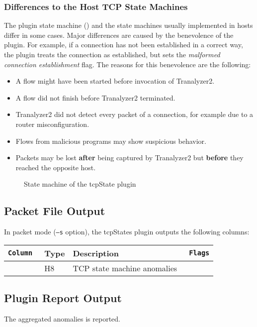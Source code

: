 \documentclass[documentation]{subfiles}
\begin{document}
\subsubsection{Differences to the Host TCP State Machines}
The plugin state machine () and the state machines usually implemented in hosts differ in some cases. Major differences are caused by the benevolence of the plugin. For example, if a connection has not been established in a correct way, the plugin treats the connection as established, but sets the {\em malformed connection establishment} flag. The reasons for this benevolence are the following:
\begin{itemize}
    \item A flow might have been started before invocation of Tranalyzer2.
    \item A flow did not finish before Tranalyzer2 terminated.
    \item Tranalyzer2 did not detect every packet of a connection, for example due to a router misconfiguration.
    \item Flows from malicious programs may show suspicious behavior.
    \item Packets may be lost {\bf after} being captured by Tranalyzer2 but {\bf before} they reached the opposite host.
\end{itemize}

\begin{figure}[!ht]
    \centering
    \caption{State machine of the tcpState plugin}
    \label{fig:tcpstates}
\end{figure}

\subsection{Packet File Output}
In packet mode ({\tt --s} option), the tcpStates plugin outputs the following columns:
\begin{longtable}{>{\tt}lll>{\tt\small}l}
    \toprule
    {\bf Column} & {\bf Type} & {\bf Description} & {\bf Flags}\\
    \midrule\endhead%
    \nameref{tcpStatesAFlags} & H8 & TCP state machine anomalies & \\
    \bottomrule
\end{longtable}

\subsection{Plugin Report Output}
The aggregated  anomalies is reported.
\end{document}
